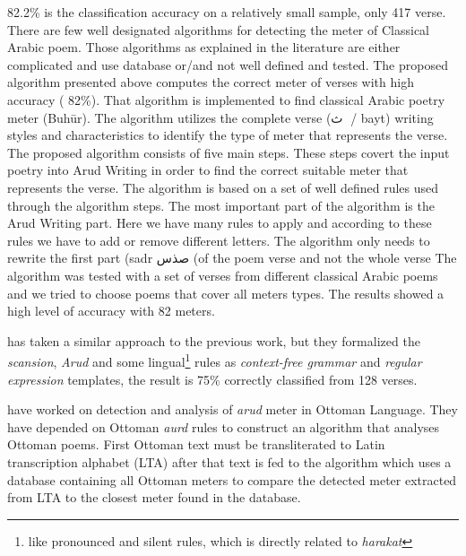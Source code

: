 \documentclass[12pt]{report}
\begin{document}
82.2\% is the classification accuracy on a relatively small sample, only 417
verse.  There are few well designated algorithms for detecting the meter of
Classical Arabic poem. Those algorithms as explained in the literature are either
complicated and use database or/and not well defined and tested. The proposed
algorithm presented above computes the correct meter of verses with high accuracy
( 82\%).  That algorithm is implemented to find classical Arabic poetry meter
(Buhūr). The algorithm utilizes the complete verse (ذٞث / bayt) writing styles and
characteristics to identify the type of meter that represents the verse. The
proposed algorithm consists of five main steps. These steps covert the input
poetry into Arud Writing in order to find the correct suitable meter that
represents the verse. The algorithm is based on a set of well defined rules used
through the algorithm steps. The most important part of the algorithm is the Arud
Writing part. Here we have many rules to apply and according to these rules we
have to add or remove different letters. The algorithm only needs to rewrite the
first part (sadr صذس (of the poem verse and not the whole verse The algorithm was
tested with a set of verses from different classical Arabic poems and we tried to
choose poems that cover all meters types. The results showed a high level of
accuracy with 82%
meters. 



\citet{Alnagdawi2013} has taken a similar approach to the previous work,
but they formalized the \textit{scansion}, \textit{Arud} and some
lingual\footnote{like pronounced and silent rules, which is directly related to
\textit{harakat}} rules as
\textit{context-free grammar} and \textit{regular expression} templates, the
result is 75\% correctly classified from 128 verses.

\citet{Kurt2012} have worked on detection and analysis of \textit{arud} meter in
Ottoman Language. They have depended on Ottoman \textit{aurd} rules to
construct an algorithm that analyses Ottoman poems. First Ottoman text
must be transliterated to Latin transcription alphabet (LTA) after that text is
fed to the algorithm which uses a database containing all Ottoman meters to
compare the detected meter extracted from LTA to the closest meter found in the
database.
\end{document}
